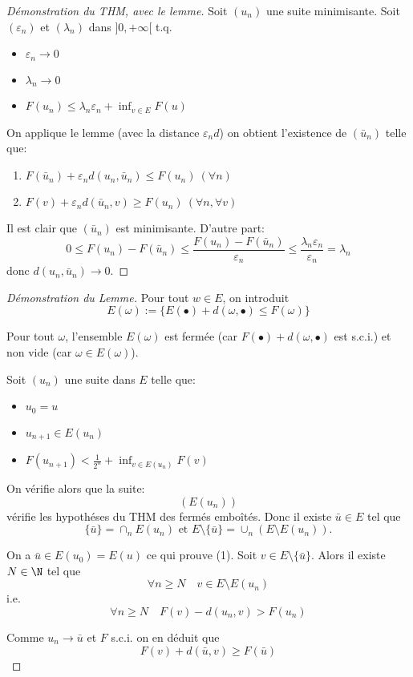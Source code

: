  \begin{proof}[Démonstration du THM, avec le lemme]
 	Soit $(u_n)$ une suite minimisante. Soit $(ε_n)$ et $(λ_n)$ dans $]0,+∞[$ t.q. 
	\begin{itemize}
		\item $ε_n\to 0$
		\item $λ_n\to 0$
		\item $F(u_n)≤λ_nε_n+\inf_{v\in E}F(u)$
	\end{itemize}
	On applique le lemme (avec la distance $ε_nd$) on obtient l'existence de $(\bar u_n)$ telle que:
	\begin{enumerate}
		\item $F(\bar u_n)+ε_nd(u_n,\bar u_n)≤F(u_n)\ (\forall n)$
		\item $F(v)+ε_nd(\bar u_n,v)≥F(u_n)\ (\forall n,\forall v)$
	\end{enumerate}
	Il est clair que $(\bar u_n)$ est minimisante.
	D'autre part:
		\[0≤F(u_n)-F(\bar u_n)≤\frac{F(u_n)-F(\bar u_n)}{ε_n}≤\frac{λ_nε_n}{ε_n}=λ_n\]
		donc $d(u_n,\bar u_n)\to 0$.
 \end{proof}
 \begin{proof}[Démonstration du Lemme]
	 Pour tout $w\in E$, on introduit
	 	\[E(ω):=\{E(•)+d(ω,•)≤F(ω)\}\]
		
	Pour tout $ω$, l'ensemble $E(ω)$ est fermée (car $F(•)+d(ω,•)$ est s.c.i.) et non vide (car $ω\in E(ω)$).
	
	Soit $(u_n)$ une suite dans $E$ telle que:
	\begin{itemize}
		\item $u_0=u$
		\item $u_{n+1}\in E(u_n)$
		\item $F(u_{n+1})<\frac{1}{2^n}+\inf_{v\in E(u_n)}F(v)$
	\end{itemize}
	On vérifie alors que la suite:
		\[(E(u_n))\]
	vérifie les hypothéses du THM des fermés emboîtés. Donc il existe $\bar u\in E$ tel que
		\[\{\bar u\}=\cap_n E(u_n)\text{ et }E\setminus\{\bar u\}=\cup_n(E\setminus E(u_n)).\]
		
		On a $\bar u\in E(u_0)=E(u)$ ce qui prouve (1). Soit $v\in E\setminus \{\bar u\}$. Alors il existe $N\in\N$ tel que
		\[ \forall n≥N\quad v\in E\setminus E(u_n)\]
		i.e.
		\[ \forall n≥N\quad F(v)-d(u_n,v)>F(u_n)\]
		
	Comme $u_n\to\bar u$ et $F$ s.c.i. on en déduit que
		\[F(v)+d(\bar u,v)≥F(\bar u)\]
 \end{proof}
 
